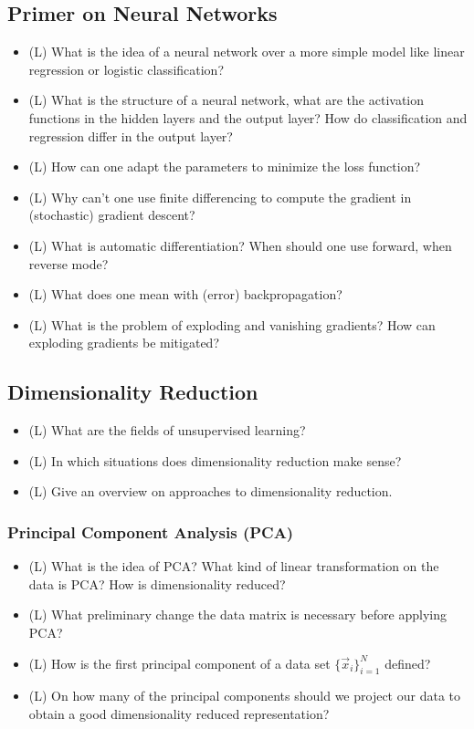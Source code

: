 \subsection*{Primer on Neural Networks\skipthis}
\begin{itemize}
    \item (L) What is the idea of a neural network over a more simple model like linear regression or logistic classification?
    \answerboxM
    \item (L) What is the structure of a neural network, what are the activation functions in the hidden layers and the output layer?
    How do classification and regression differ in the output layer?
    \answerboxM
    \item (L) How can one adapt the parameters to minimize the loss function?
    \answerboxM
    \item (L) Why can't one use finite differencing to compute the gradient in (stochastic) gradient descent?
    \answerboxM
    \item (L) What is automatic differentiation? When should one use forward, when reverse mode?
    \answerboxM
    \item (L) What does one mean with (error) backpropagation?
    \answerboxM
    \item (L) What is the problem of exploding and vanishing gradients? How can exploding gradients be mitigated?
    \answerboxM
\end{itemize}

\subsection*{Dimensionality Reduction}

\begin{itemize}
    \item (L) What are the fields of unsupervised learning?
    \answerboxM
    \item (L) In which situations does dimensionality reduction make sense?
    \answerboxM
    \item (L) Give an overview on approaches to dimensionality reduction.
    \answerboxM
\end{itemize}

\subsubsection*{Principal Component Analysis (PCA)}

\begin{itemize}
    \item (L) What is the idea of PCA? What kind of linear transformation on the data is PCA? How is dimensionality reduced?
    \answerboxM
    \item (L) What preliminary change the data matrix is necessary before applying PCA?
    \answerboxM
    \item (L) How is the first principal component of a data set $\{ \vec{x}_i \}_{i=1}^N$ defined?
    \answerboxM
    \item (L) On how many of the principal components should we project our data to obtain a good dimensionality 
    reduced representation?
    \answerboxM
\end{itemize}

